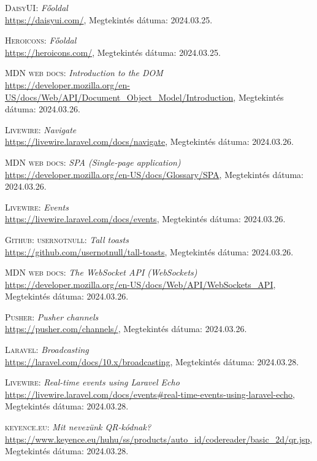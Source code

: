 \documentclass[
]{thesis-ekf}
\theoremstyle{definition}
\theoremstyle{remark}
\begin{document}
\begin{thebibliography}{47}
\textsc{DaisyUI}: \emph{Főoldal}
\\
\url{https://daisyui.com/}, Megtekintés dátuma: 2024.03.25.

\textsc{Heroicons}: \emph{Főoldal}
\\
\url{https://heroicons.com/}, Megtekintés dátuma: 2024.03.25.

\textsc{MDN web docs}: \emph{Introduction to the DOM}
\\
\url{https://developer.mozilla.org/en-US/docs/Web/API/Document_Object_Model/Introduction}, Megtekintés dátuma: 2024.03.26.

\textsc{Livewire}: \emph{Navigate}
\\
\url{https://livewire.laravel.com/docs/navigate}, Megtekintés dátuma: 2024.03.26.

\textsc{MDN web docs}: \emph{SPA (Single-page application)}
\\
\url{https://developer.mozilla.org/en-US/docs/Glossary/SPA}, Megtekintés dátuma: 2024.03.26.

\textsc{Livewire}: \emph{Events}
\\
\url{https://livewire.laravel.com/docs/events}, Megtekintés dátuma: 2024.03.26.

\textsc{Github: usernotnull}: \emph{Tall toasts}
\\
\url{https://github.com/usernotnull/tall-toasts}, Megtekintés dátuma: 2024.03.26.

\textsc{MDN web docs}: \emph{The WebSocket API (WebSockets)}
\\
\url{https://developer.mozilla.org/en-US/docs/Web/API/WebSockets_API}, Megtekintés dátuma: 2024.03.26.

\textsc{Pusher}: \emph{Pusher channels}
\\
\url{https://pusher.com/channels/}, Megtekintés dátuma: 2024.03.26.

\textsc{Laravel}: \emph{Broadcasting}
\\
\url{https://laravel.com/docs/10.x/broadcasting}, Megtekintés dátuma: 2024.03.28.

\textsc{Livewire}: \emph{Real-time events using Laravel Echo}
\\
\url{https://livewire.laravel.com/docs/events#real-time-events-using-laravel-echo}, Megtekintés dátuma: 2024.03.28.

\textsc{keyence.eu}: \emph{Mit nevezünk QR-kódnak?}
\\
\url{https://www.keyence.eu/huhu/ss/products/auto_id/codereader/basic_2d/qr.jsp}, Megtekintés dátuma: 2024.03.28.


\end{thebibliography}
\end{document}
